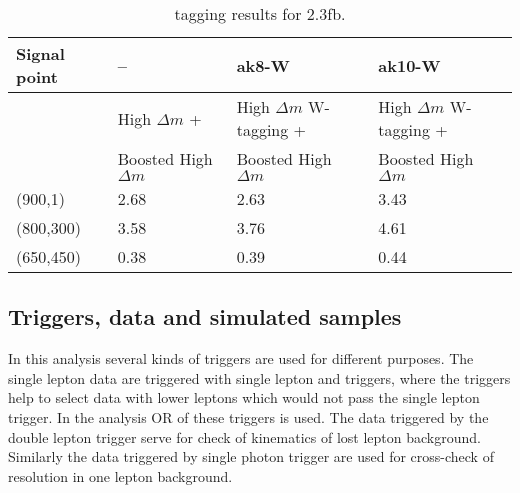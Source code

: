 \begin{table}[h]
\begin{center}
\begin{tabular}{|l|l|l|l|}
\hline
Signal point             & --      & ak8-W & ak10-W \\
\hline
                       & High $\Delta m$ +           &  High $\Delta m$ W-tagging +  &   High $\Delta m$ W-tagging +  \\
                       &  Boosted High $\Delta m$    & Boosted High $\Delta m$       &   Boosted High $\Delta m$  \\
\hline
\hline
(900,1) &     2.68 & 2.63 & 3.43  \\
\hline
(800,300) &   3.58 & 3.76 & 4.61  \\
\hline
(650,450) &   0.38 & 0.39 & 0.44  \\
\hline
\end{tabular}
\caption[Table caption text]{tagging results for 2.3fb. }
\label{tab:taggingResults}
\end{center}
\end{table}




\subsection{Triggers, data and simulated samples~\label{sec:trigger}}

In this analysis several kinds of triggers are used for different purposes. The single lepton data are triggered with single lepton and \MET triggers, where the \MET triggers help to select data with lower \pt leptons which would not pass the single lepton trigger. In the analysis OR of these triggers is used. The data triggered by the double lepton trigger serve for check of kinematics of lost lepton background. Similarly the data triggered by single photon trigger are used for cross-check of \MET resolution in one lepton background.

